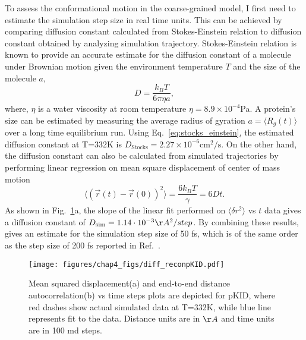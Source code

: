 \documentclass[../talant.diss.submit.tex]{subfiles}
\begin{document}
To assess the conformational motion in the coarse-grained model, I first need to estimate the simulation
step size in real time units. This can be achieved by comparing diffusion constant calculated
from Stokes-Einstein relation to diffusion constant obtained by analyzing simulation trajectory.
Stokes-Einstein relation is known to provide an accurate estimate for the diffusion constant
of a molecule under Brownian motion given the environment temperature $T$ and the size of the
molecule $a$,
\begin{equation}
  \label{eq:stocks_einstein}
  D = \frac{k_{B} T}{6 \pi \eta a},  
\end{equation}
where, $\eta$ is a water viscosity at room temperature $\eta =8.9 \times 10^{-4}$Pa.
A protein's size can be estimated by measuring the average radius of gyration $a = \langle R_{g}(t) \rangle$
over a long time equilibrium run. Using Eq.~\ref{eq:stocks_einstein}, the estimated diffusion constant at
T=332K is $D_{\mathrm{Stocks}} = 2.27 \times 10^{-6} \mathrm{cm^{2} / s}$.
%
On the other hand, the diffusion constant can also be calculated from simulated trajectories
by performing linear regression on mean square displacement of center of mass motion
\begin{equation}
  \label{eq:msd_equ}
  \langle (\vec r(t) - \vec r(0))^{2} \rangle = \frac{6 k_{B} T}{\gamma} = 6Dt.  
\end{equation}
As shown in Fig.~\ref{fig:diff_reconpKID}a,  the slope of the linear fit performed on $\langle \delta r ^{2} \rangle$ vs $t$ data gives a diffusion constant of
$D_{\mathrm{sim}} = 1.14 \cdot 10^{-3} \AA^2 /step$.
%
By combining these results, gives an
estimate for the simulation step size of 50 fs, which is of the same order as the
step size of 200 fs reported in Ref.~\cite{takada:12}.%


\begin{figure}[htp!]
  \begin{centering}
    \texttt{[image: figures/chap4\_figs/diff\_reconpKID.pdf]}
    \caption{Mean squared displacement(a) and end-to-end distance autocorrelation(b) vs time steps
      plots are depicted for pKID, where red dashes show actual simulated
      data at T=332K, while blue line represents fit to the data.  Distance units are
      in $\AA$ and time units are in 100 md steps.} 
    \label{fig:diff_reconpKID}
  \end{centering}
\end{figure}
%
%
\end{document}
